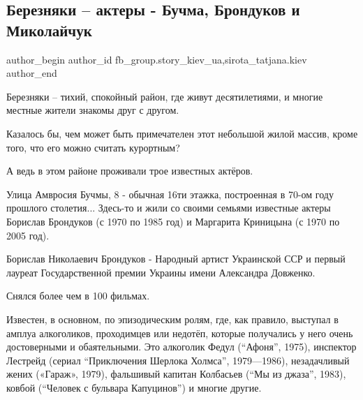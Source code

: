  
 
 
 
 
 
\subsection{Березняки – актеры - Бучма, Брондуков и Миколайчук}
\label{sec:06_11_2021.fb.fb_group.story_kiev_ua.1.bereznjaki_aktery_buchma_brondukov_mykolajchuk}
 
\ifcmt
 author_begin
   author_id fb_group.story_kiev_ua,sirota_tatjana.kiev
 author_end
\fi

Березняки – тихий, спокойный район, где живут десятилетиями, и многие местные
жители знакомы друг с другом.

Казалось бы, чем может быть примечателен этот небольшой жилой массив, кроме
того, что его можно считать курортным?

А ведь в этом районе проживали трое известных актёров.

Улица Амвросия Бучмы, 8 - обычная 16ти этажка, построенная в 70-ом году
прошлого столетия... Здесь-то и жили со своими семьями известные актеры
Борислав Брондуков (с 1970 по 1985 год) и Маргарита Криницына (с 1970 по 2005
год).

Борислав Николаевич Брондуков - Народный артист Украинской ССР и первый лауреат
Государственной премии Украины имени Александра Довженко. 

Снялся более чем в 100 фильмах.

Известен, в основном, по эпизодическим ролям, где, как правило, выступал в
амплуа алкоголиков, проходимцев или недотёп, которые получались у него очень
достоверными и обаятельными. Это алкоголик Федул (\enquote{Афоня}, 1975), инспектор
Лестрейд (сериал \enquote{Приключения Шерлока Холмса}, 1979—1986), незадачливый жених
(«Гараж», 1979), фальшивый капитан Колбасьев (\enquote{Мы из джаза}, 1983), ковбой
(\enquote{Человек с бульвара Капуцинов}) и многие другие.


